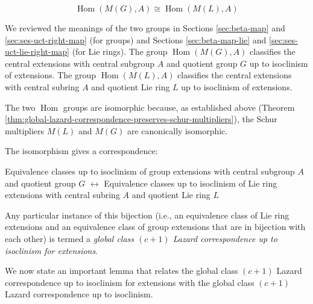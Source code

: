 $$\operatorname{Hom}(M(G),A) \cong \operatorname{Hom}(M(L), A)$$

We reviewed the meanings of the two groups in Sections
\ref{sec:beta-map} and \ref{sec:ses-uct-right-map} (for groups) and
Sections \ref{sec:beta-map-lie} and \ref{sec:ses-uct-lie-right-map}
(for Lie rings). The group $\operatorname{Hom}(M(G),A)$
classifies the central extensions with central subgroup $A$ and
quotient group $G$ up to isoclinism of extensions. The group
$\operatorname{Hom}(M(L),A)$ classifies the central extensions
with central subring $A$ and quotient Lie ring $L$ up to isoclinism of
extensions.

The two $\operatorname{Hom}$ groups are isomorphic because, as
established above (Theorem
\ref{thm:global-lazard-correspondence-preserves-schur-multipliers}),
the Schur multipliers $M(L)$ and $M(G)$ are canonically isomorphic.

The isomorphism gives a correspondence:

\begin{center}
  Equivalence classes up to isoclinism of group extensions with central
  subgroup $A$ and quotient group $G$ $\leftrightarrow$
  Equivalence classes up to isoclinism of Lie ring extensions with
  central subring $A$ and quotient Lie ring $L$
\end{center}

Any particular instance of this bijection (i.e., an equivalence class
of Lie ring extensions and an equivalence class of group extensions
that are in bijection with each other) is termed a {\em global class
  $(c + 1)$ Lazard correspondence up to isoclinism for extensions}.

We now state an important lemma that relates the global class $(c + 1)$
Lazard correspondence up to isoclinism for extensions with the global
class $(c + 1)$ Lazard correspondence up to isoclinism.


